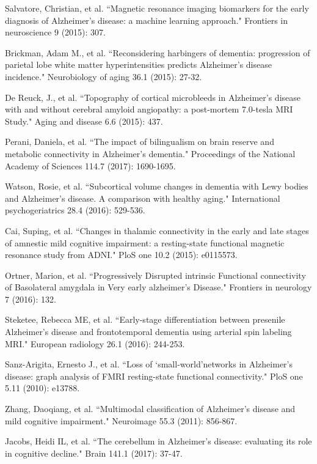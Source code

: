 \documentclass[journal]{IEEEtran}
\begin{document}
\begin{thebibliography}{1}
		Salvatore, Christian, et al. ``Magnetic resonance imaging biomarkers for the early diagnosis of Alzheimer's disease: a machine learning approach." Frontiers in neuroscience 9 (2015): 307.
		
		
		
		
		
		
		
		
		
		
		
		
		
		
		
		Brickman, Adam M., et al. ``Reconsidering harbingers of dementia: progression of parietal lobe white matter hyperintensities predicts Alzheimer's disease incidence." Neurobiology of aging 36.1 (2015): 27-32.
		
		De Reuck, J., et al. ``Topography of cortical microbleeds in Alzheimer’s disease with and without cerebral amyloid angiopathy: a post-mortem 7.0-tesla MRI Study." Aging and disease 6.6 (2015): 437.
		
		Perani, Daniela, et al. ``The impact of bilingualism on brain reserve and metabolic connectivity in Alzheimer's dementia." Proceedings of the National Academy of Sciences 114.7 (2017): 1690-1695.
		
		Watson, Rosie, et al. ``Subcortical volume changes in dementia with Lewy bodies and Alzheimer's disease. A comparison with healthy aging." International psychogeriatrics 28.4 (2016): 529-536.
		
		Cai, Suping, et al. ``Changes in thalamic connectivity in the early and late stages of amnestic mild cognitive impairment: a resting-state functional magnetic resonance study from ADNI." PloS one 10.2 (2015): e0115573.
		
		Ortner, Marion, et al. ``Progressively Disrupted intrinsic Functional connectivity of Basolateral amygdala in Very early alzheimer’s Disease." Frontiers in neurology 7 (2016): 132.
		
		Steketee, Rebecca ME, et al. ``Early-stage differentiation between presenile Alzheimer’s disease and frontotemporal dementia using arterial spin labeling MRI." European radiology 26.1 (2016): 244-253.
		
		Sanz-Arigita, Ernesto J., et al. ``Loss of ‘small-world’networks in Alzheimer's disease: graph analysis of FMRI resting-state functional connectivity." PloS one 5.11 (2010): e13788.
		
		Zhang, Daoqiang, et al. ``Multimodal classification of Alzheimer's disease and mild cognitive impairment." Neuroimage 55.3 (2011): 856-867.
		
		
		Jacobs, Heidi IL, et al. ``The cerebellum in Alzheimer’s disease: evaluating its role in cognitive decline." Brain 141.1 (2017): 37-47.
		
	
		
	\end{thebibliography}
	
\end{document}
